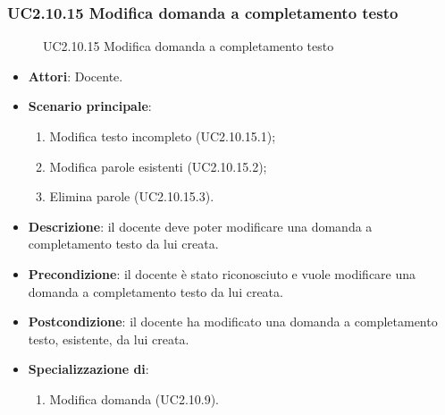 \subsubsection{UC2.10.15 Modifica domanda a completamento testo}
\begin{figure}[H]
\centering
\noindent{}
\caption{UC2.10.15 Modifica domanda a completamento testo}
\end{figure}
\begin{itemize}
\item \textbf{Attori}: Docente.
\item \textbf{Scenario principale}:
\begin{enumerate}
\item Modifica testo incompleto (UC2.10.15.1);
\item Modifica parole esistenti (UC2.10.15.2);
\item Elimina parole (UC2.10.15.3).
\end{enumerate}
\item \textbf{Descrizione}: il docente deve poter modificare una domanda a completamento testo da lui creata.
\item \textbf{Precondizione}: il docente è stato riconosciuto e vuole modificare una domanda a completamento testo da lui creata.
\item \textbf{Postcondizione}: il docente ha modificato una domanda a completamento testo, esistente, da lui creata.
\item \textbf{Specializzazione di}:
\begin{enumerate}
\item Modifica domanda (UC2.10.9).
\end{enumerate}
\end{itemize}

